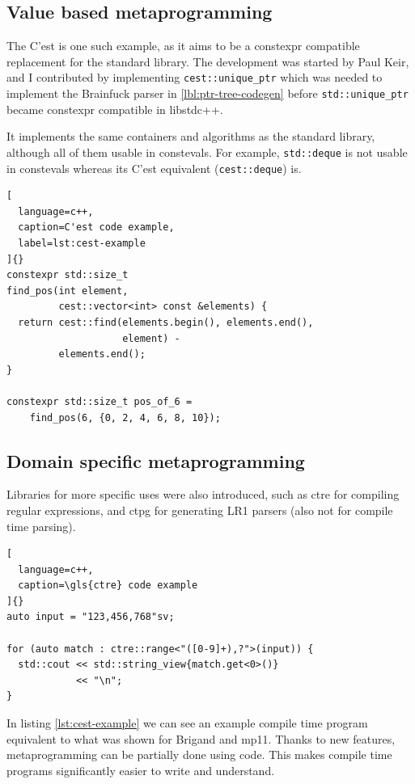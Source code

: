 \documentclass[../main]{subfiles}
\begin{document}
\subsection{
  Value based metaprogramming
}

The C'est\cite{cest} is one such example, as it aims to be a \gls{constexpr}
compatible replacement for the \cpp standard library. The development was
started by Paul Keir, and I contributed by implementing
\lstinline{cest::unique_ptr} which was needed to implement the Brainfuck parser
in \ref{lbl:ptr-tree-codegen} before \lstinline{std::unique_ptr} became
\gls{constexpr} compatible in libstdc++.

It implements the same containers and algorithms as the \cpp standard library,
although all of them usable in \glspl{consteval}. For example,
\lstinline{std::deque} is not usable in \glspl{consteval} whereas
its C'est equivalent (\lstinline{cest::deque}) is.

\begin{lstlisting}[
  language=c++,
  caption=C'est code example,
  label=lst:cest-example
]{}
constexpr std::size_t
find_pos(int element,
         cest::vector<int> const &elements) {
  return cest::find(elements.begin(), elements.end(),
                    element) -
         elements.end();
}

constexpr std::size_t pos_of_6 =
    find_pos(6, {0, 2, 4, 6, 8, 10});
\end{lstlisting}

\subsection{
  Domain specific metaprogramming
}

Libraries for more specific uses were also introduced, such as
\gls{ctre} \cite{ctre} for compiling regular expressions,
and \gls{ctpg} \cite{ctpg} for generating LR1 parsers
(also not for compile time parsing).

\begin{lstlisting}[
  language=c++,
  caption=\gls{ctre} code example
]{}
auto input = "123,456,768"sv;

for (auto match : ctre::range<"([0-9]+),?">(input)) {
  std::cout << std::string_view{match.get<0>()}
            << "\n";
}
\end{lstlisting}

In listing \ref{lst:cest-example} we can see an example compile time program
equivalent to what was shown for Brigand and mp11. Thanks to new \cpp features,
metaprogramming can be partially done using \cpp code. This makes
compile time programs significantly easier to write and understand.
\end{document}
